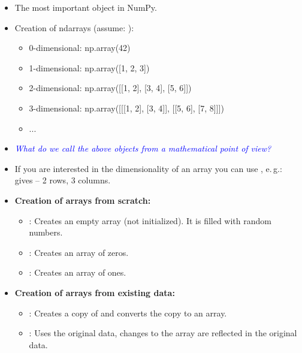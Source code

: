 \begin{frame}
	\begin{itemize}
		\item The most important object in NumPy.
		\item Creation of ndarrays (assume: ):
		\begin{itemize}
			\item 0-dimensional: np.array(42)
			\item 1-dimensional: np.array([1, 2, 3])
			\item 2-dimensional: np.array([[1, 2], [3, 4], [5, 6]])
			\item 3-dimensional: np.array([[[1, 2], [3, 4]], [[5, 6], [7, 8]]])
			\item ...
		\end{itemize}
		\item \textcolor{blue}{\textit{What do we call the above objects from a mathematical point of view?}}
		\item If you are interested in the dimensionality of an array you can use , e.\,g.: \\
			 gives  -- 2 rows, 3 columns.
	\end{itemize}
\end{frame}


\begin{frame}
	\begin{itemize}
		\item \textbf{Creation of arrays from scratch:}
		\begin{itemize}
			\item {}: Creates an empty array (not initialized). It is filled with random numbers.
			\item {}: Creates an array of zeros.
			\item {}: Creates an array of ones.
		\end{itemize}
	\end{itemize}
	
	\begin{itemize}
		\item \textbf{Creation of arrays from existing data:}
		\begin{itemize}
			\item {}: Creates a copy of  and converts the copy to an array.
			\item {}: Uses the original data, changes to the array are reflected in the original data.
		\end{itemize}
	\end{itemize}
\end{frame}


